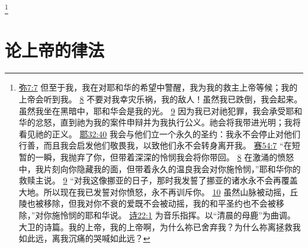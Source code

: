 \documentclass[12pt, a4paper, oneside]{ctexart}
\begin{document}
	\footnote {
		\href{https://biblehub.com/micah/7-7.htm}{弥7:7} 但至于我，我在对耶和华的希望中警醒，我为我的救主上帝等候；我的上帝会听到我。
		\href{https://biblehub.com/micah/7-8.htm}{8} 不要对我幸灾乐祸，我的敌人！虽然我已跌倒，我会起来。虽然我坐在黑暗中，耶和华会是我的光。
		\href{https://biblehub.com/micah/7-9.htm}{9} 因为我已对祂犯罪，我会承受耶和华的忿怒，直到祂为我的案件申辩并为我执行公义。祂会将我带进光明；我将看见祂的正义。
		\href{https://biblehub.com/jeremiah/32-40.htm}{耶32:40} 我会与他们立一个永久的圣约：我永不会停止对他们行善，而且我会启发他们敬畏我，以致他们永不会转身离开我。
		\href{https://biblehub.com/isaiah/54-7.htm}{赛54:7} “在短暂的一瞬，我抛弃了你，但带着深深的怜悯我会将你带回。
		\href{https://biblehub.com/isaiah/54-8.htm}{8} 在激涌的愤怒中，我片刻向你隐藏我的面，但带着永久的温良我会对你施怜悯，”耶和华你的救赎主说。
		\href{https://biblehub.com/isaiah/54-9.htm}{9} “对我这像挪亚的日子，那时我发誓了挪亚的诸水永不会再覆盖大地。所以现在我已发誓对你愤怒，永不再训斥你。
		\href{https://biblehub.com/isaiah/54-10.htm}{10} 虽然山脉被动摇，丘陵也被移除，但我对你不衰的爱既不会被动摇，我的和平圣约也不会被移除，”对你施怜悯的耶和华说。
		\href{https://biblehub.com/psalms/22-1.htm}{诗22:1} 为音乐指挥。以“清晨的母鹿”为曲调。大卫的诗篇。我的上帝，我的上帝啊，为什么祢已舍弃我？为什么祢离拯救我如此远，离我沉痛的哭喊如此远？
	}

\section{论上帝的律法}
\end{document}
